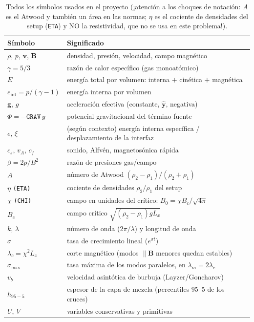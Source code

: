 \documentclass[11pt,a4paper]{article}
\newcommand{\B}{\mathbf{B}}
\newcommand{\vct}{\mathbf{v}}
\newcommand{\code}[1]{\texttt{#1}}
\begin{document}
\begin{table}[H]
\centering\small
\caption{Todos los símbolos usados en el proyecto (¡atención a los choques de notación:
$A$ es el Atwood y también un área en las normas; $\eta$ es el cociente de densidades del
setup (\code{ETA}) y NO la resistividad, que no se usa en este problema!).}
\begin{tabular}{@{}lp{11.6cm}@{}}
\toprule
Símbolo & Significado \\
\midrule
$\rho$, $p$, $\vct$, $\B$ & densidad, presión, velocidad, campo magnético \\
$\gamma=5/3$ & razón de calor específico (gas monoatómico) \\
$E$ & energía total por volumen: interna $+$ cinética $+$ magnética \\
$e_\mathrm{int}=p/(\gamma-1)$ & energía interna por volumen \\
$\mathbf{g}$, $g$ & aceleración efectiva (constante, $\hat{\mathbf{y}}$, negativa) \\
$\Phi=-\code{GRAV}\,y$ & potencial gravitacional del término fuente \\
$e$, $\xi$ & (según contexto) energía interna específica / desplazamiento de la interfaz \\
$c_s$, $v_A$, $c_f$ & sonido, Alfvén, magnetosónica rápida \\
$\beta=2p/B^2$ & razón de presiones gas/campo \\
$A$ & número de Atwood $(\rho_2-\rho_1)/(\rho_2+\rho_1)$ \\
$\eta$ \code{(ETA)} & cociente de densidades $\rho_2/\rho_1$ del setup \\
$\chi$ \code{(CHI)} & campo en unidades del crítico: $B_0=\chi B_c/\sqrt{4\pi}$ \\
$B_c$ & campo crítico $\sqrt{(\rho_2-\rho_1)gL_x}$ \\
$k$, $\lambda$ & número de onda ($2\pi/\lambda$) y longitud de onda \\
$\sigma$ & tasa de crecimiento lineal ($e^{\sigma t}$) \\
$\lambda_c=\chi^2L_x$ & corte magnético (modos $\parallel\B$ menores quedan estables) \\
$\sigma_\mathrm{max}$ & tasa máxima de los modos paralelos, en $\lambda_m=2\lambda_c$ \\
$v_b$ & velocidad asintótica de burbuja (Layzer/Goncharov) \\
$h_{95-5}$ & espesor de la capa de mezcla (percentiles 95--5 de los cruces) \\
$U$, $V$ & variables conservativas y primitivas \\

\end{tabular}
\end{table}
\end{document}
